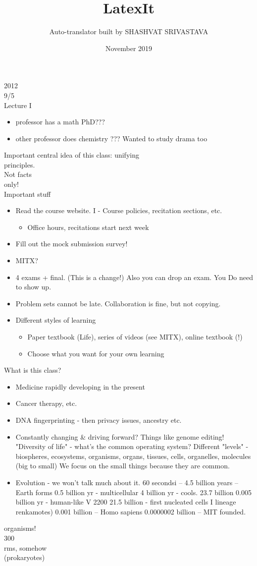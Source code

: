 \documentclass{article}
\title{LatexIt}
\author{Auto-translator built by SHASHVAT SRIVASTAVA}
\date{November 2019}
\begin{document}
2012\\
9/5\\
Lecture I
\begin{itemize}
\item  professor has a math PhD???
\item  other professor does chemistry ??? Wanted to study drama too
\end{itemize}
Important central idea of this class: unifying\\
principles.\\
Not facts\\
only!\\
Important stuff
\begin{itemize}
\item  Read the course website.
I - Course policies, recitation sections, etc.
\begin{itemize}
\item  Office hours, recitations start next week
\end{itemize}
\item  Fill out the mock submission survey!
\item  MITX?
\item 4 exams + final. (This is a change!) Also you can drop an exam.
You Do need to show up.
\item  Problem sets cannot be late. Collaboration is fine, but not copying.
\item  Different styles of learning
\begin{itemize}
\item  Paper textbook (Life), series of videos (see MITX), online textbook (!)
\item  Choose what you want for your own learning
\end{itemize}
\end{itemize}
What is this class?
\begin{itemize}
\item  Medicine rapidly developing in the present
\item  Cancer therapy, etc.
\item  DNA fingerprinting - then privacy issues, ancestry etc.
\item  Constantly changing \& driving forward? Things like genome editing!
"Diversity of life" - what's the common operating system?
Different "levels" - biospheres, ecosystems, organisms, organs, tissues, cells,
organelles, molecules (big to small)
We focus on the small things because they are common.
\item  Evolution - we won't talk much about it. 60 secondsi
– 4.5 billion years – Earth forms
0.5 billion yr - multicellular
4 billion yr - cools.
23.7 billion
0.005 billion yr - human-like
V 2200 21.5 billion - first nucleated cells I
lineage
renkamotes)
0.001 billion – Homo sapiens
0.0000002 billion – MIT founded.
\end{itemize}
organisms!\\
300\\
rms, somehow\\
(prokaryotes)\\
\end{document}
